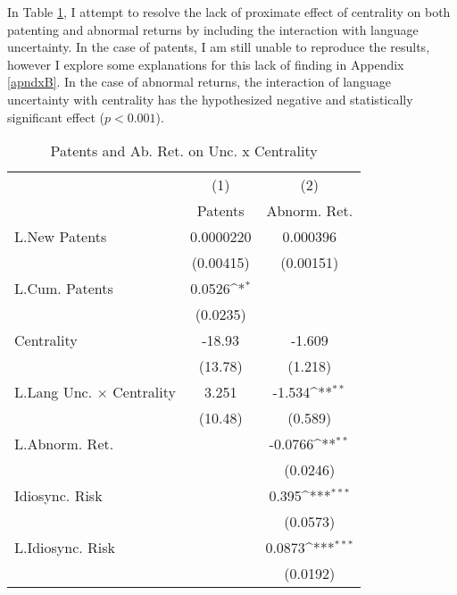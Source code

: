 In Table \ref{r7}, I attempt to resolve the lack of proximate effect of centrality on both patenting and abnormal returns by including the interaction with language uncertainty. In the case of patents, I am still unable to reproduce the results, however I explore some explanations for this lack of finding in Appendix \ref{apndxB}. In the case of abnormal returns, the interaction of language uncertainty with centrality has the hypothesized negative and statistically significant effect ($p<0.001$).

\begin{table}[htbp]\centering \caption[Regression of Patents and Ab. Ret. on Unc. x Centrality]{Patents and Ab. Ret. on Unc. x Centrality\label{r7}}
{
\def\sym#1{\ifmmode^{#1}\else\(^{#1}\)\fi}
\begin{tabular}{l*{2}{c}}
\hline\hline
                    &\multicolumn{1}{c}{(1)}&\multicolumn{1}{c}{(2)}\\
                    &\multicolumn{1}{c}{Patents}&\multicolumn{1}{c}{Abnorm. Ret.}\\
\hline
L.New Patents       &   0.0000220         &    0.000396         \\
                    &   (0.00415)         &   (0.00151)         \\
L.Cum. Patents      &      0.0526\sym{*}  &                     \\
                    &    (0.0235)         &                     \\
Centrality          &      -18.93         &      -1.609         \\
                    &     (13.78)         &     (1.218)         \\
L.Lang Unc. $\times$ Centrality&       3.251         &      -1.534\sym{**} \\
                    &     (10.48)         &     (0.589)         \\
L.Abnorm. Ret.      &                     &     -0.0766\sym{**} \\
                    &                     &    (0.0246)         \\
Idiosync. Risk      &                     &       0.395\sym{***}\\
                    &                     &    (0.0573)         \\
L.Idiosync. Risk    &                     &      0.0873\sym{***}\\
                    &                     &    (0.0192)         \\

\end{tabular}}
\end{table}
